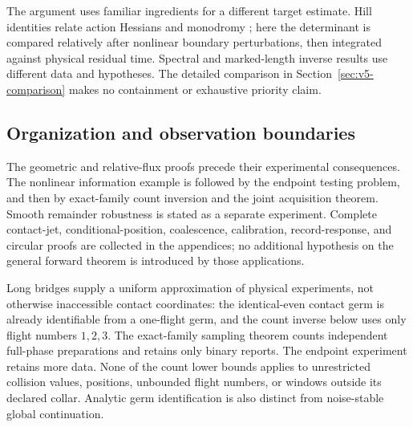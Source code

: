 The argument uses familiar ingredients for a different target estimate.
Hill identities relate action Hessians and monodromy \cite{Hill}; here
the determinant is compared relatively after nonlinear boundary
perturbations, then integrated against physical residual time. Spectral
and marked-length inverse results \cite{Zelditch,DSKL,FinamoreLeguil}
use different data and hypotheses. The detailed comparison in
Section~\ref{sec:v5-comparison} makes no containment or exhaustive
priority claim.

\subsection{Organization and observation boundaries}
The geometric and relative-flux proofs precede their experimental
consequences. The nonlinear information example is followed by the
endpoint testing problem, and then by exact-family count inversion and
the joint acquisition theorem. Smooth remainder robustness is stated as
a separate experiment. Complete contact-jet, conditional-position,
coalescence, calibration, record-response, and circular proofs are
collected in the appendices; no additional hypothesis on the general
forward theorem is introduced by those applications.

Long bridges supply a uniform approximation of physical experiments,
not otherwise inaccessible contact coordinates: the identical-even
contact germ is already identifiable from a one-flight germ, and the
count inverse below uses only flight numbers $1,2,3$. The exact-family
sampling theorem counts independent full-phase preparations and retains
only binary reports. The endpoint experiment retains more data. None of
the count lower bounds applies to unrestricted collision values,
positions, unbounded flight numbers, or windows outside its declared
collar. Analytic germ identification is also distinct from noise-stable
global continuation.
